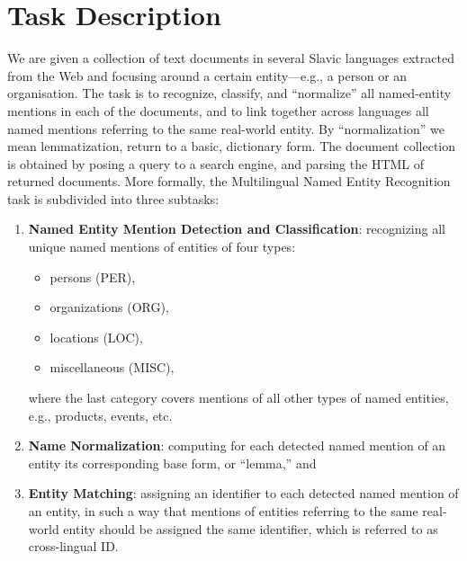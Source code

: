\documentclass[11pt]{article}
\begin{document}
\section{Task Description}
\label{sec:task}

We are given a collection of text documents in several Slavic languages
extracted from the Web and focusing around a certain entity---e.g., a
person or an organisation.  The task is to recognize, classify, and
``normalize'' all named-entity mentions in each of the documents, and to
link together across languages all named mentions referring to the same
real-world entity.  By ``normalization'' we mean lemmatization, return to
a basic, dictionary form.  The document collection is obtained by posing
a query to a search engine, and parsing the HTML of returned documents.
More formally, the Multilingual Named Entity Recognition task is
subdivided into three subtasks:

\begin{enumerate}
  
\item \textbf{Named Entity Mention Detection and Classification}:
  recognizing all unique named mentions of entities of four types:
  \begin{itemize}
  \item persons (PER), 
  \item organizations (ORG),
  \item locations (LOC),
  \item miscellaneous (MISC),
  \end{itemize}

  where the last category covers mentions of all other types of named
  entities, e.g., products, events, etc.

\item \textbf{Name Normalization}: computing for each detected named
  mention of an entity its corresponding base form, or ``lemma,'' and

\item \textbf{Entity Matching}: assigning an identifier to each detected
  named mention of an entity, in such a way that mentions of entities
  referring to the same real-world entity should be assigned the same
  identifier, which is referred to as cross-lingual ID.

\end{enumerate}
\end{document}
